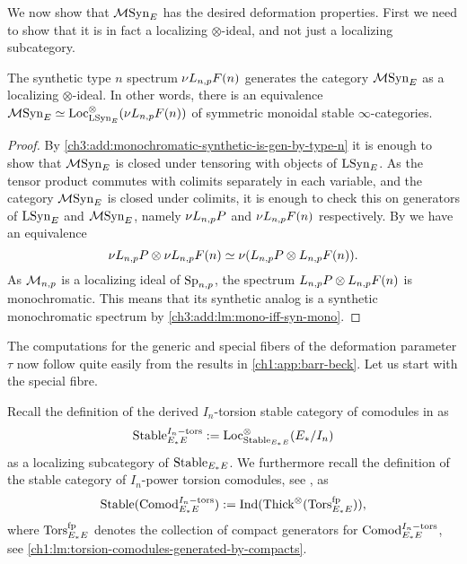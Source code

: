 We now show that $\mathcal{M}\mathrm{Syn}_{E}$ has the desired deformation properties. First we need to show that it is in fact a localizing $\otimes$-ideal, and not just a localizing subcategory. 

\begin{lemma}
    The synthetic type $n$ spectrum $\nu L_{n,p} F(n)$ generates the category $\mathcal{M}\mathrm{Syn}_{E}$ as a localizing $\otimes$-ideal. In other words, there is an equivalence $\mathcal{M}\mathrm{Syn}_{E} \simeq \operatorname{Loc}_{\mathrm{LSyn}_{E}}^\otimes(\nu L_{n,p} F(n))$ of symmetric monoidal stable $\infty$-categories. 
\end{lemma}
\begin{proof}
    By \cref{ch3:add:monochromatic-synthetic-is-gen-by-type-n} it is enough to show that $\mathcal{M}\mathrm{Syn}_{E}$ is closed under tensoring with objects of $\mathrm{LSyn}_{E}$. As the tensor product commutes with colimits separately in each variable, and the category $\mathcal{M}\mathrm{Syn}_{E}$ is closed under colimits, it is enough to check this on generators of $\mathrm{LSyn}_{E}$ and $\mathcal{M}\mathrm{Syn}_{E}$, namely $\nu L_{n,p} P$ and $\nu L_{n,p} F(n)$ respectively. By \cite[4.24]{pstragowski_2022} we have an equivalence 
    \[\nu L_{n,p} P \otimes \nu L_{n,p} F(n) \simeq \nu(L_{n,p} P \otimes L_{n,p} F(n)).\]
    As $\mathcal{M}_{n,p}$ is a localizing ideal of $\mathrm{Sp}_{n,p}$, the spectrum $L_{n,p} P \otimes L_{n,p} F(n)$ is monochromatic. This means that its synthetic analog is a synthetic monochromatic spectrum by \cref{ch3:add:lm:mono-iff-syn-mono}. 
\end{proof}

The computations for the generic and special fibers of the deformation parameter $\tau$ now follow quite easily from the results in \cref{ch1:app:barr-beck}. Let us start with the special fibre. 

Recall the definition of the derived $I_n$-torsion stable category of comodules in \cite[2.4]{barthel-heard-valenzuela_2020} as 
\[\mathrm{Stable}_{E_*E}^{I_n-\mathrm{tors}} := \operatorname{Loc}_{\mathrm{Stable}_{E_*E}}^\otimes(E_{*}/I_n)\] 
as a localizing subcategory of $\mathrm{Stable}_{E_*E}$. We furthermore recall the definition of the stable category of $I_n$-power torsion comodules, see \cite[3.5]{barthel-heard-valenzuela_2020}, as 
\[\mathrm{Stable}(\mathrm{Comod}_{E_*E}^{I_n-\mathrm{tors}}) := \operatorname{Ind}(\operatorname{Thick}^\otimes(\mathrm{Tors}_{E_*E}^{\mathrm{fp}})),\]
where $\mathrm{Tors}_{E_*E}^{\mathrm{fp}}$ denotes the collection of compact generators for $\mathrm{Comod}_{E_*E}^{I_n-\mathrm{tors}}$, see \cref{ch1:lm:torsion-comodules-generated-by-compacts}. 

